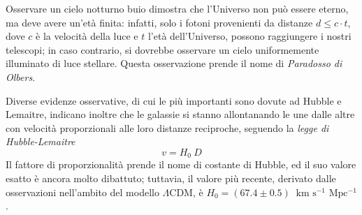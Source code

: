 Osservare un cielo notturno buio dimostra che l'Universo non può essere eterno, ma deve avere un'età finita: infatti, solo i fotoni provenienti da distanze $d \le c \cdot t$, dove $c$ è la velocità della luce e $t$ l'età dell'Universo, possono raggiungere i nostri telescopi; in caso contrario, si dovrebbe osservare un cielo uniformemente illuminato di luce stellare.  Questa osservazione prende il nome di \emph{Paradosso di Olbers}.

Diverse evidenze osservative, di cui le più importanti sono dovute ad Hubble e Lemaitre, indicano inoltre che le galassie si stanno allontanando le une dalle altre con velocità proporzionali alle loro distanze reciproche, seguendo la \emph{legge di Hubble-Lemaitre}  
\begin{equation}
    v = H_0\ D
\end{equation}
Il fattore di proporzionalità prende il nome di costante di Hubble, ed il suo valore esatto è ancora molto dibattuto; tuttavia, il valore più recente, derivato dalle osservazioni nell'ambito del modello $\Lambda$CDM, è $H_0 = (67.4 \pm 0.5)\ \text{ km s$^{-1}$ Mpc$^{-1}$}$ \parencite{Planck2018}.

